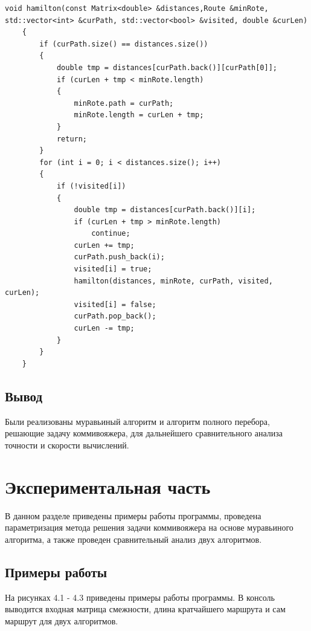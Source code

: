 \documentclass[a4paper,12pt]{report}
\begin{document}
\begin{lstlisting}[caption=Рекурсивная функция алгоритма полного перебора]
    void hamilton(const Matrix<double> &distances,Route &minRote, std::vector<int> &curPath, std::vector<bool> &visited, double &curLen)
    {
        if (curPath.size() == distances.size())
        {
            double tmp = distances[curPath.back()][curPath[0]];
            if (curLen + tmp < minRote.length)
            {
                minRote.path = curPath;
                minRote.length = curLen + tmp;
            }
            return;
        }
        for (int i = 0; i < distances.size(); i++)
        {
            if (!visited[i])
            {
                double tmp = distances[curPath.back()][i];
                if (curLen + tmp > minRote.length)
                    continue;
                curLen += tmp;
                curPath.push_back(i);
                visited[i] = true;
                hamilton(distances, minRote, curPath, visited, curLen);
                visited[i] = false;
                curPath.pop_back();
                curLen -= tmp;
            }
        }
    }
\end{lstlisting}

\section{Вывод}
\hspace{0.6cm}Были реализованы муравьиный алгоритм и алгоритм полного перебора, решающие задачу коммивояжера, для дальнейшего сравнительного анализа точности и скорости вычислений. 

\chapter{Экспериментальная часть}
\hspace{0.6cm}В данном разделе приведены примеры работы программы, проведена параметризация метода решения задачи коммивояжера на основе муравьиного алгоритма, а также проведен сравнительный анализ двух алгоритмов.
\section{Примеры работы}
\hspace{0.6cm}На рисунках 4.1 - 4.3 приведены примеры работы программы. В консоль выводится входная матрица смежности, длина кратчайшего маршрута и сам маршрут для двух алгоритмов.
\end{document}
